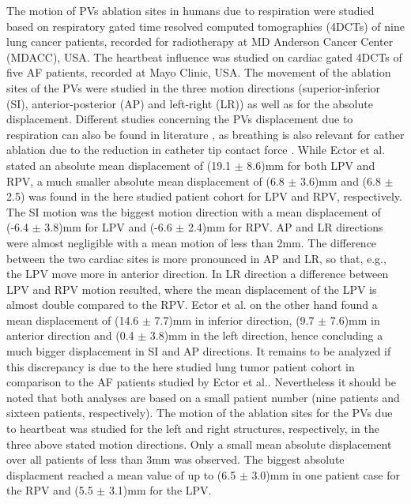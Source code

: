The motion of PVs ablation sites in humans due to respiration were studied based on respiratory gated time resolved computed tomographies 
(4DCTs) of nine lung cancer patients, recorded for radiotherapy at MD Anderson Cancer Center (MDACC), USA. The heartbeat influence was studied 
on cardiac gated 4DCTs of five AF patients, recorded at Mayo Clinic, USA.\newline
\newline
The movement of the ablation sites of the PVs were studied in the three motion directions (superior-inferior (SI), anterior-posterior (AP) 
and left-right (LR)) as well as for the absolute displacement. Different studies concerning the PVs displacement due to respiration can also 
be found in literature \cite{Ect08, Nos05}, as breathing is also relevant for cather ablation due to the reduction in catheter 
tip contact force \cite{Kum12}. While Ector et al. stated an absolute mean displacement of (19.1 $\pm$ 8.6)mm for both LPV and RPV, 
a much smaller absolute mean displacement of (6.8 $\pm$ 3.6)mm and (6.8 $\pm$ 2.5) was found in the here studied patient cohort for LPV 
and RPV, respectively. The SI motion was the biggest motion direction with a mean displacement of (-6.4 $\pm$ 3.8)mm for LPV 
and (-6.6 $\pm$ 2.4)mm for RPV. AP and LR directions were almost negligible with a mean motion of less than 2mm. 
The difference between the two cardiac sites is more pronounced in AP and LR, so that, e.g., the LPV move more in 
anterior direction. In LR direction a difference between LPV and RPV motion resulted, where the mean displacement of the LPV is 
almost double compared to the RPV. Ector et al. on the other hand found a mean displacement of (14.6 $\pm$ 7.7)mm in inferior direction, 
(9.7 $\pm$ 7.6)mm in anterior direction and (0.4 $\pm$ 3.8)mm in the left direction, hence concluding a much bigger displacement in SI and AP 
directions. It remains to be analyzed if this discrepancy is due to the here studied lung tumor patient cohort in comparison to the AF 
patients studied by Ector et al.. Nevertheless it should be noted that both analyses are based on a small patient number (nine patients 
and sixteen patients, respectively).\newline
\newline
The motion of the ablation sites for the PVs due to heartbeat was studied for the left and right structures, respectively, in the three 
above stated motion directions. Only a small mean absolute displacement over all patients of less than 3mm was observed. The biggest 
absolute displacment reached a mean value of up to (6.5 $\pm$ 3.0)mm in one patient case for the RPV and (5.5 $\pm$ 3.1)mm for the LPV. 
